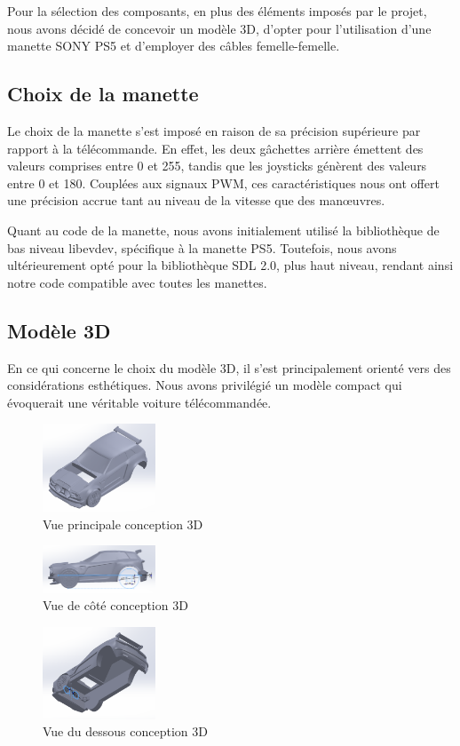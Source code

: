 Pour la sélection des composants, en plus des éléments imposés par le projet, nous avons décidé de concevoir un modèle 3D, d'opter pour l'utilisation d'une manette SONY PS5 et d'employer des câbles femelle-femelle.

\subsection{Choix de la manette}
Le choix de la manette s'est imposé en raison de sa précision supérieure par rapport à la télécommande. En effet, les deux gâchettes arrière émettent des valeurs comprises entre 0 et 255, tandis que les joysticks génèrent des valeurs entre 0 et 180. Couplées aux signaux PWM, ces caractéristiques nous ont offert une précision accrue tant au niveau de la vitesse que des manœuvres.

Quant au code de la manette, nous avons initialement utilisé la bibliothèque de bas niveau libevdev, spécifique à la manette PS5. Toutefois, nous avons ultérieurement opté pour la bibliothèque SDL 2.0, plus haut niveau, rendant ainsi notre code compatible avec toutes les manettes.

\subsection{Modèle 3D}
En ce qui concerne le choix du modèle 3D, il s'est principalement orienté vers des considérations esthétiques. Nous avons privilégié un modèle compact qui évoquerait une véritable voiture télécommandée.

\begin{figure}[h]
    \centering
    \includegraphics[width=0.3\textwidth]{images/solidworks/solidworks1.png}
    \caption{Vue principale conception 3D}
    \label{fig:Vue principale conception 3D}
\end{figure}

\begin{figure}[h]
    \centering
    \includegraphics[width=0.3\textwidth]{images/solidworks/solidworks3.png}
    \caption{Vue de côté conception 3D}
    \label{fig:Vue de côté conception 3D}
\end{figure}

\begin{figure}[h]
    \centering
    \includegraphics[width=0.3\textwidth]{images/solidworks/solidworks4.png}
    \caption{Vue du dessous conception 3D}
    \label{fig:Vue du dessous conception 3D}
\end{figure}

\newpage